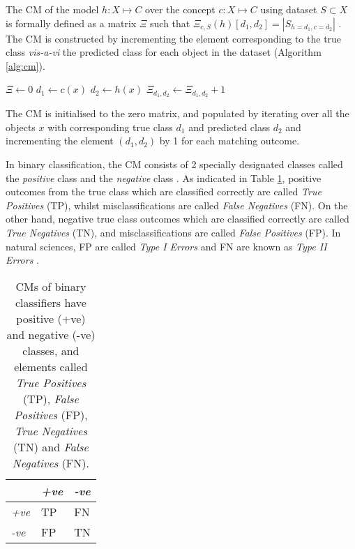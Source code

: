 The CM of the model $h : X \mapsto C$ over the concept $c : X \mapsto C$ using dataset $S \subset X$ is formally defined  as a matrix $\Xi$ such that $\Xi_{c,S}(h)[d_1,d_2] = |S_{h=d_1,c=d_2}|$ \citep{cichosz2014data}. The CM is constructed by incrementing the element corresponding to the true class \textit{vis-a-vi} the predicted class for each object in the dataset (Algorithm \ref{alg:cm}).


\begin{algorithm}
  \begin{algorithmic}
    \State $\Xi \gets 0$
      \State $d_1 \gets c(x)$
      \State $d_2 \gets h(x)$
      \State $\Xi_{d_1,d_2} \gets \Xi_{d_1,d_2} + 1$
    \EndFor
  \end{algorithmic}
  \caption{The CM is initialised to the zero matrix, and populated by iterating over all the objects $x$ with corresponding true class $d_1$ and predicted class $d_2$ and incrementing the element $(d_1,d_2)$ by 1 for each matching outcome.}
  \label{alg:cm}
\end{algorithm}

In binary classification, the CM consists of 2 specially designated classes called the \textit{positive} class and the \textit{negative} class \citep{saito2015precision}. As indicated in Table \ref{tab:cm_binary}, positive outcomes from the true class  which are classified correctly are called \textit{True Positives} (TP), whilst misclassifications are called \textit{False Negatives} (FN). On the other hand, negative true class outcomes which are classified correctly are called \textit{True Negatives} (TN), and misclassifications are called \textit{False Positives} (FP). In natural sciences, FP are called \textit{Type I Errors} and FN are known as \textit{Type II Errors} \citep{fielding1997review}.

\begin{table}[ht]
  \centering
  \selectfont
  \begin{tabular}{lll}
    \toprule
                  & \textit{+ve} & \textit{-ve} \\
    \midrule
    \textit{+ve}  & TP           & FN \\
    \textit{-ve}  & FP           & TN \\
    \bottomrule
  \end{tabular}
  \caption{CMs of binary classifiers have positive (+ve) and negative (-ve) classes, and elements called \textit{True Positives} (TP), \textit{False Positives} (FP), \textit{True Negatives} (TN) and \textit{False Negatives} (FN).}
  \label{tab:cm_binary}
\end{table}

